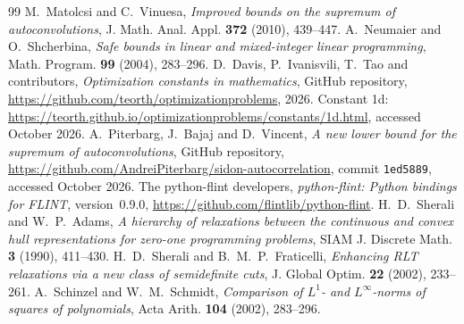 \documentclass[11pt]{amsart}
\theoremstyle{definition}
\theoremstyle{remark}
\numberwithin{equation}{section}
\begin{document}
\begin{thebibliography}{99}
 M.~Matolcsi and C.~Vinuesa, \emph{Improved bounds on the supremum of autoconvolutions}, J. Math. Anal. Appl. \textbf{372} (2010), 439--447.
 A.~Neumaier and O.~Shcherbina, \emph{Safe bounds in linear and mixed-integer linear programming}, Math. Program. \textbf{99} (2004), 283--296.
 D.~Davis, P.~Ivanisvili, T.~Tao and contributors, \emph{Optimization constants in mathematics}, GitHub repository, \url{https://github.com/teorth/optimizationproblems}, 2026. Constant 1d: \url{https://teorth.github.io/optimizationproblems/constants/1d.html}, accessed October 2026.
 A.~Piterbarg, J.~Bajaj and D.~Vincent, \emph{A new lower bound for the supremum of autoconvolutions}, GitHub repository, \url{https://github.com/AndreiPiterbarg/sidon-autocorrelation}, commit \texttt{1ed5889}, accessed October 2026.
 The python-flint developers, \emph{python-flint: Python bindings for FLINT}, version~0.9.0, \url{https://github.com/flintlib/python-flint}.
 H.~D.~Sherali and W.~P.~Adams, \emph{A hierarchy of relaxations between the continuous and convex hull representations for zero-one programming problems}, SIAM J. Discrete Math. \textbf{3} (1990), 411--430.
 H.~D.~Sherali and B.~M.~P.~Fraticelli, \emph{Enhancing RLT relaxations via a new class of semidefinite cuts}, J. Global Optim. \textbf{22} (2002), 233--261.
 A.~Schinzel and W.~M.~Schmidt, \emph{Comparison of $L^1$- and $L^\infty$-norms of squares of polynomials}, Acta Arith. \textbf{104} (2002), 283--296.
\end{thebibliography}
\end{document}
